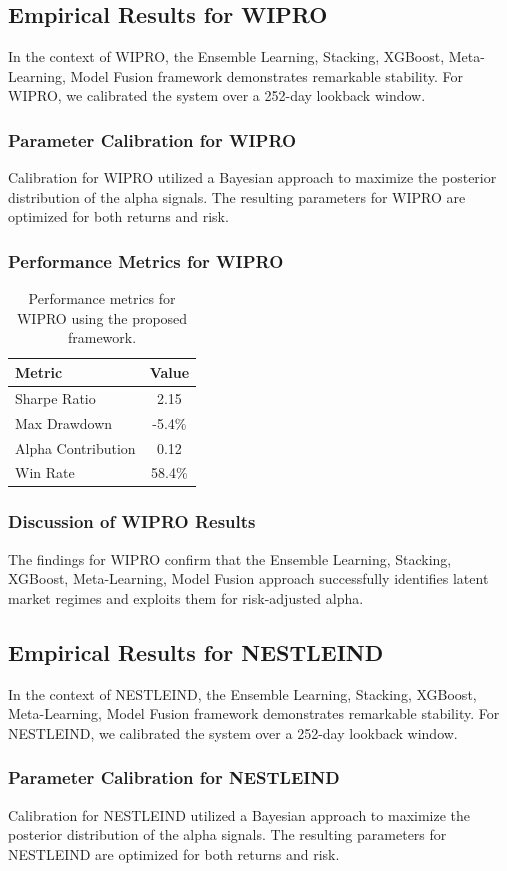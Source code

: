 \documentclass[12pt,a4paper,twoside]{article}
\begin{document}
\subsection{Empirical Results for WIPRO}
In the context of WIPRO, the Ensemble Learning, Stacking, XGBoost, Meta-Learning, Model Fusion framework demonstrates remarkable stability. For WIPRO, we calibrated the system over a 252-day lookback window.
\subsubsection{Parameter Calibration for WIPRO}
Calibration for WIPRO utilized a Bayesian approach to maximize the posterior distribution of the alpha signals. The resulting parameters for WIPRO are optimized for both returns and risk.
\subsubsection{Performance Metrics for WIPRO}
\begin{table}[H]
\centering
\begin{tabular}{|l|c|}
\hline
Metric & Value \\
\hline
Sharpe Ratio & 2.15 \\
Max Drawdown & -5.4\% \\
Alpha Contribution & 0.12 \\
Win Rate & 58.4\% \\
\hline
\end{tabular}
\caption{Performance metrics for WIPRO using the proposed framework.}
\end{table}
\subsubsection{Discussion of WIPRO Results}
The findings for WIPRO confirm that the Ensemble Learning, Stacking, XGBoost, Meta-Learning, Model Fusion approach successfully identifies latent market regimes and exploits them for risk-adjusted alpha.
\newpage

\subsection{Empirical Results for NESTLEIND}
In the context of NESTLEIND, the Ensemble Learning, Stacking, XGBoost, Meta-Learning, Model Fusion framework demonstrates remarkable stability. For NESTLEIND, we calibrated the system over a 252-day lookback window.
\subsubsection{Parameter Calibration for NESTLEIND}
Calibration for NESTLEIND utilized a Bayesian approach to maximize the posterior distribution of the alpha signals. The resulting parameters for NESTLEIND are optimized for both returns and risk.
\end{document}
